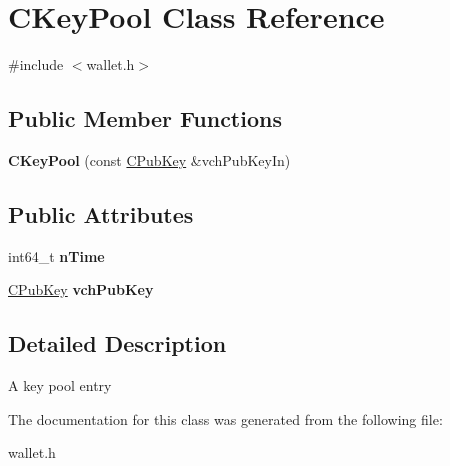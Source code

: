 \hypertarget{class_c_key_pool}{}\section{C\+Key\+Pool Class Reference}
\label{class_c_key_pool}


{\ttfamily \#include $<$wallet.\+h$>$}

\subsection*{Public Member Functions}
\begin{DoxyCompactItemize}
\item 
\mbox{\label{class_c_key_pool_a63e27cd41ea374cc909436b3083b68c4}} 
{\bfseries C\+Key\+Pool} (const \mbox{\hyperlink{class_c_pub_key}{C\+Pub\+Key}} \&vch\+Pub\+Key\+In)
\end{DoxyCompactItemize}
\subsection*{Public Attributes}
\begin{DoxyCompactItemize}
\item 
\mbox{\label{class_c_key_pool_aa2f8263f0baf732ad5b4e4b59b482209}} 
int64\+\_\+t {\bfseries n\+Time}
\item 
\mbox{\label{class_c_key_pool_a937080a4cec1f2b138ebd200557c82b5}} 
\mbox{\hyperlink{class_c_pub_key}{C\+Pub\+Key}} {\bfseries vch\+Pub\+Key}
\end{DoxyCompactItemize}


\subsection{Detailed Description}
A key pool entry 

The documentation for this class was generated from the following file\+:\begin{DoxyCompactItemize}
\item 
wallet.\+h\end{DoxyCompactItemize}
